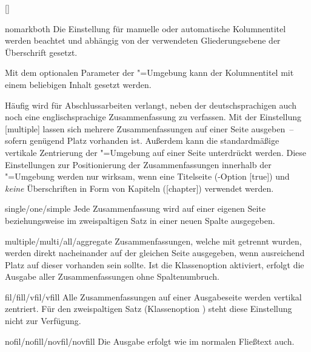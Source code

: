 \begin{Declaration*}{}
\begin{Declaration*}{}
\begin{Declaration*}{}
\begin{Declaration}{[\PSet]}
\begin{values}
\item[nomarkboth]
  Die Einstellung für manuelle oder automatische Kolumnentitel werden beachtet 
  und abhängig von der verwendeten Gliederungsebene der Überschrift gesetzt.
\end{values}
%
Mit dem optionalen Parameter  der 
"=Umgebung kann der Kolumnentitel mit einem beliebigen 
Inhalt gesetzt werden.

Häufig wird für Abschlussarbeiten verlangt, neben der deutschsprachigen auch 
noch eine englischsprachige Zusammenfassung zu verfassen. Mit der Einstellung 
[multiple] lassen sich mehrere Zusammenfassungen auf einer 
Seite ausgeben~-- sofern genügend Platz vorhanden ist. Außerdem kann die 
standardmäßige vertikale Zentrierung der "=Umgebung 
auf einer Seite unterdrückt werden. Diese Einstellungen zur Positionierung der 
Zusammenfassungen innerhalb der "=Umgebung werden nur 
wirksam, wenn eine Titelseite (\KOMAScript-Option [true]) und 
\emph{keine} Überschriften in Form von Kapiteln ([chapter]) 
verwendet werden.
%
\begin{values}
\item[single/one/simple]
  Jede Zusammenfassung wird auf einer eigenen Seite
  beziehungsweise im zweispaltigen Satz in einer neuen Spalte ausgegeben.
\item[multiple/multi/all/aggregate]
  Zusammenfassungen, welche mit  getrennt wurden, werden 
  direkt nacheinander auf der gleichen Seite ausgegeben, wenn ausreichend Platz 
  auf dieser vorhanden sein sollte. Ist die Klassenoption  
  aktiviert, erfolgt die Ausgabe aller Zusammenfassungen ohne Spaltenumbruch.
\item[fil/fill/vfil/vfill]
  Alle Zusammenfassungen auf einer Ausgabeseite werden vertikal zentriert. Für 
  den zweispaltigen Satz (Klassenoption ) steht diese 
  Einstellung nicht zur Verfügung.
\item[nofil/nofill/novfil/novfill]
  Die Ausgabe erfolgt wie im normalen Fließtext auch.
\end{values}
\end{Declaration}


\end{Declaration*}
\end{Declaration*}
\end{Declaration*}
